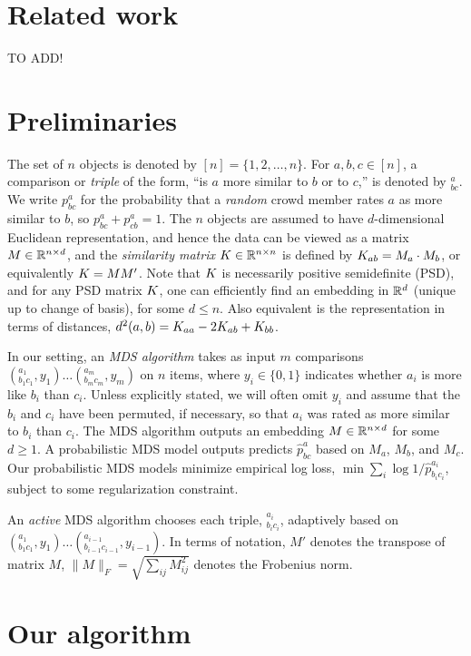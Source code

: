 \documentclass{article}
\begin{document}
\section{Related work}

TO ADD!

\section{Preliminaries}\label{sec:prelim}

The set of $n$ objects is denoted by $[n]=\{1,2,\ldots,n\}$.  For $a,b,c \in [n]$, a comparison or {\em triple} of the form, ``is $a$ more similar to $b$ or to $c$,'' is denoted by $^a_{bc}$. We write $p^a_{bc}$ for the probability that a {\em random} crowd member rates $a$ as more similar to $b$, so $p^a_{bc}+p^a_{cb}=1$.
The $n$ objects are assumed to have $d$-dimensional Euclidean representation, and hence the data can be viewed as a matrix $M \in \reals^{n \times d}$, and the {\em similarity matrix} $\S \in \reals^{n \times n}$ is defined by $\S_{ab}=M_a\cdot M_b$, or equivalently $\S = MM'$.  Note that $\S$ is necessarily positive semidefinite (PSD), and for any PSD matrix $\S$, one can efficiently find an embedding in $\reals^d$ (unique up to change of basis), for some $d \leq n$.  Also equivalent is the representation in terms of distances, $d^2(a,b)=\S_{aa}-2\S_{ab}+\S_{bb}$.

In our setting, an {\em MDS algorithm} takes as input $m$ comparisons $(^{a_1}_{b_1c_1},y_1) \ldots (^{a_m}_{b_mc_m},y_m)$ on $n$ items, where $y_i\in \{0,1\}$ indicates whether $a_i$ is more like $b_i$ than $c_i$.  Unless explicitly stated, we will often omit $y_i$ and assume that the $b_i$ and $c_i$ have been permuted, if necessary, so that $a_i$ was rated as more similar to $b_i$ than $c_i$.  The MDS algorithm outputs an embedding $M \in \reals^{n \times d}$ for some $d \geq 1.$  A probabilistic MDS model outputs predicts $\hat{p}^{a}_{bc}$ based on $M_a$, $M_b$, and $M_c$.  Our probabilistic MDS models minimize empirical log loss, $\min \sum_i \log 1/\hat{p}^{a_i}_{b_ic_i}$, subject to some regularization constraint.

An {\em active} MDS algorithm chooses each triple, $^{a_i}_{b_ic_i}$, adaptively based on $(^{a_1}_{b_1c_1},y_1) \ldots (^{a_{i-1}}_{b_{i-1}c_{i-1}},y_{i-1})$.
In terms of notation, $M'$ denotes the transpose of matrix $M$, $\|M\|_F=\sqrt{\sum_{ij} M_{ij}^2}$ denotes the Frobenius norm.


\section{Our algorithm}
\end{document}
